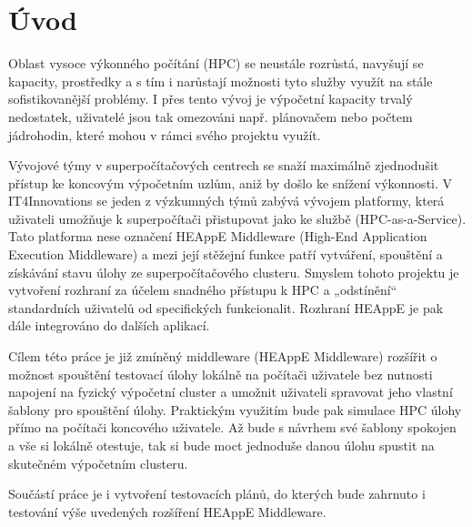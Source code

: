 \chapter{Úvod}
\label{sec:Introduction}
Oblast vysoce výkonného počítání (HPC) se neustále rozrůstá, navyšují se kapacity, prostředky a s tím i narůstají možnosti tyto služby využít na stále sofistikovanější problémy. I přes tento vývoj je výpočetní kapacity trvalý nedostatek, uživatelé jsou tak omezováni např. plánovačem nebo počtem jádrohodin, které mohou v rámci svého projektu využít.

Vývojové týmy v superpočítačových centrech se snaží maximálně zjednodušit přístup ke koncovým výpočetním uzlům, aniž by došlo ke snížení výkonnosti. V IT4Innovations se jeden z výzkumných týmů zabývá vývojem platformy, která uživateli umožňuje k superpočítači přistupovat jako ke službě (HPC-as-a-Service). Tato platforma nese označení HEAppE Middleware (High-End Application Execution Middleware) a mezi její stěžejní funkce patří vytváření, spouštění a získávání stavu úlohy ze superpočítačového clusteru. Smyslem tohoto projektu je vytvoření rozhraní za účelem snadného přístupu k HPC a „odstínění“ standardních uživatelů od specifických funkcionalit. Rozhraní HEAppE je pak dále integrováno do dalších aplikací.

Cílem této práce je již zmíněný middleware (HEAppE Middleware) rozšířit o možnost spouštění testovací úlohy lokálně na počítači uživatele bez nutnosti napojení na fyzický výpočetní cluster a umožnit uživateli spravovat jeho vlastní šablony pro spouštění úlohy. Praktickým využitím bude pak simulace HPC úlohy přímo na počítači koncového uživatele. Až bude s návrhem své šablony spokojen a vše si lokálně otestuje, tak si bude moct jednoduše danou úlohu spustit na skutečném výpočetním clusteru.

Součástí práce je i vytvoření testovacích plánů, do kterých bude zahrnuto i testování výše uvedených rozšíření HEAppE Middleware.
\endinput
